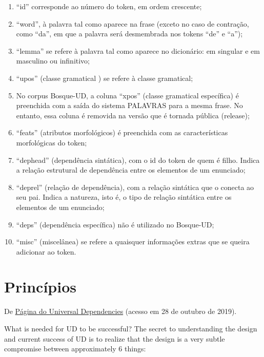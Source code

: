 \documentclass[output=paper,colorlinks,citecolor=brown]{langscibook}
\begin{document}
\begin{enumerate}
    \item “id” corresponde ao número do token, em ordem crescente;
    \item “word”, à palavra tal como aparece na frase (exceto no caso de contração, como “da”, em que a palavra será desmembrada nos tokens “de” e “a”);
    \item “lemma” se refere à palavra tal como aparece no dicionário: em singular e em masculino ou infinitivo;
    \item “upos” (classe gramatical ) se refere à classe gramatical;
    \item No corpus Bosque-UD, a coluna “xpos” (classe gramatical específica) é preenchida com a saída do sistema PALAVRAS \citep{bick2000parsing} para a mesma frase. No entanto, essa coluna é removida na versão que é tornada pública (release);
    \item “feats” (atributos morfológicos) é preenchida com as características morfológicas do token;
    \item “dephead” (dependência sintática), com o id do token de quem é filho. Indica a relação estrutural de dependência entre os elementos de um enunciado; 
    \item “deprel” (relação de dependência), com a relação sintática que o conecta ao seu pai.  Indica a natureza, isto é, o tipo de relação sintática entre os elementos de um enunciado;
    \item “deps” (dependência específica) não é utilizado no Bosque-UD;
    \item “misc” (miscelânea) se refere a quaisquer informações extras que se queira adicionar ao token.
\end{enumerate}{}

\section{Princípios}\label{sec:principios}

	De \href{https://universaldependencies.org/introduction.html}{Página do Universal Dependencies} (acesso em 28 de outubro de 2019).
	
	What is needed for UD to be successful?
	The secret to understanding the design and current success of UD is to realize that the design is a very subtle compromise between approximately 6 things:
	
\end{document}
